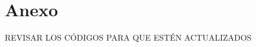 \chapter*{Anexo}\label{ch:Anexo}
\begin{Huge}
    REVISAR LOS CÓDIGOS PARA QUE ESTÉN ACTUALIZADOS
\end{Huge}


